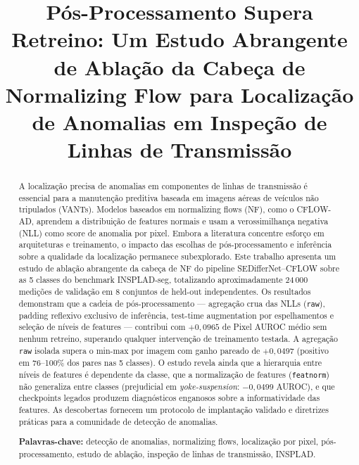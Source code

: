\documentclass[conference]{IEEEtran}
\begin{document}
\title{Pós-Processamento Supera Retreino: Um Estudo Abrangente de Ablação da Cabeça de Normalizing Flow para Localização de Anomalias em Inspeção de Linhas de Transmissão}

\author{
}

\maketitle

\begin{abstract}
A localização precisa de anomalias em componentes de linhas de transmissão é essencial para a manutenção preditiva baseada em imagens aéreas de veículos não tripulados (VANTs). Modelos baseados em normalizing flows (NF), como o CFLOW-AD, aprendem a distribuição de features normais e usam a verossimilhança negativa (NLL) como score de anomalia por pixel. Embora a literatura concentre esforço em arquiteturas e treinamento, o impacto das escolhas de pós-processamento e inferência sobre a qualidade da localização permanece subexplorado. Este trabalho apresenta um estudo de ablação abrangente da cabeça de NF do pipeline SEDifferNet--CFLOW sobre as 5 classes do benchmark INSPLAD-seg, totalizando aproximadamente 24\,000 medições de validação em 8 conjuntos de held-out independentes. Os resultados demonstram que a cadeia de pós-processamento --- agregação crua das NLLs (\texttt{raw}), padding reflexivo exclusivo de inferência, test-time augmentation por espelhamentos e seleção de níveis de features --- contribui com $+0{,}0965$ de Pixel AUROC médio sem nenhum retreino, superando qualquer intervenção de treinamento testada. A agregação \texttt{raw} isolada supera o min-max por imagem com ganho pareado de $+0{,}0497$ (positivo em 76--100\% dos pares nas 5 classes). O estudo revela ainda que a hierarquia entre níveis de features é dependente da classe, que a normalização de features (\texttt{featnorm}) não generaliza entre classes (prejudicial em \textit{yoke-suspension}: $-0{,}0499$ AUROC), e que checkpoints legados produzem diagnósticos enganosos sobre a informatividade das features. As descobertas fornecem um protocolo de implantação validado e diretrizes práticas para a comunidade de detecção de anomalias.

\vspace{0.5em}
\noindent\textbf{Palavras-chave:} detecção de anomalias, normalizing flows, localização por pixel, pós-processamento, estudo de ablação, inspeção de linhas de transmissão, INSPLAD.
\end{abstract}
\end{document}
